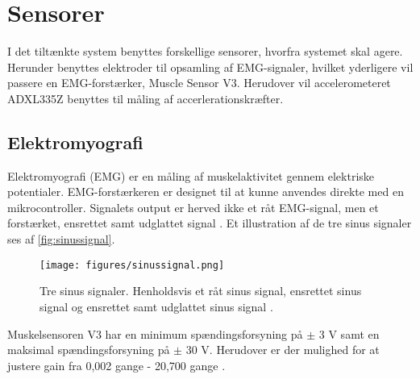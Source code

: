 \section{Sensorer} \label{sec:sensorer}
I det tiltænkte system benyttes forskellige sensorer, hvorfra systemet skal agere. Herunder benyttes elektroder til opsamling af EMG-signaler, hvilket yderligere vil passere en EMG-forstærker, Muscle Sensor V3. Herudover vil accelerometeret ADXL335Z benyttes til måling af accerlerationskræfter.

\subsection{Elektromyografi}
Elektromyografi (EMG) er en måling af muskelaktivitet gennem elektriske potentialer. 
EMG-forstærkeren er designet til at kunne anvendes direkte med en mikrocontroller. Signalets output er herved ikke et råt EMG-signal, men et forstærket, ensrettet samt udglattet signal \citep{advancertech2013}. Et illustration af de tre sinus signaler ses af \autoref{fig:sinussignal}.

\begin{figure}[H]
\centering
\texttt{[image: figures/sinussignal.png]}
\caption{Tre sinus signaler. Henholdsvis et råt sinus signal, ensrettet sinus signal og ensrettet samt udglattet sinus signal \citep{advancertech2013}.}
\label{fig:sinussignal}
\end{figure}

Muskelsensoren V3 har en minimum spændingsforsyning på $\pm$ 3 V samt en maksimal spændingsforsyning på $\pm$ 30 V. Herudover er der mulighed for at justere gain fra 0,002 gange - 20,700 gange \citep{advancertech2013}.





